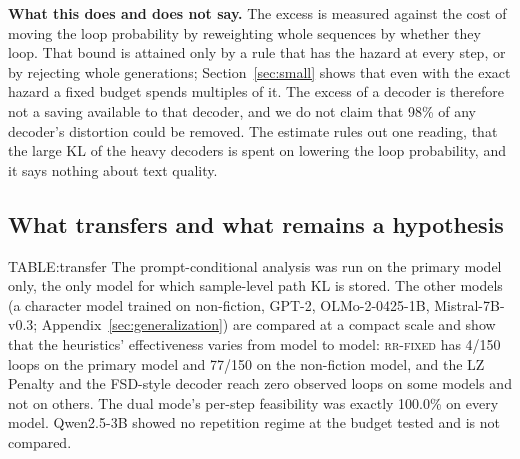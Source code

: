\textbf{What this does and does not say.} The excess is measured against the cost of moving the loop probability by reweighting whole sequences by whether they loop. That bound is attained only by a rule that has the hazard at every step, or by rejecting whole generations; Section~\ref{sec:small} shows that even with the exact hazard a fixed budget spends multiples of it. The excess of a decoder is therefore not a saving available to that decoder, and we do not claim that 98\% of any decoder's distortion could be removed. The estimate rules out one reading, that the large KL of the heavy decoders is spent on lowering the loop probability, and it says nothing about text quality.

\subsection{What transfers and what remains a hypothesis}\label{ssec:transfer}
{{TABLE:transfer}}
The prompt-conditional analysis was run on the primary model only, the only model for which sample-level path KL is stored. The other models (a character model trained on non-fiction, GPT-2, OLMo-2-0425-1B, Mistral-7B-v0.3; Appendix~\ref{sec:generalization}) are compared at a compact scale and show that the heuristics' effectiveness varies from model to model: \textsc{rr-fixed} has 4/150 loops on the primary model and 77/150 on the non-fiction model, and the LZ Penalty and the FSD-style decoder reach zero observed loops on some models and not on others. The dual mode's per-step feasibility was exactly 100.0\% on every model. Qwen2.5-3B showed no repetition regime at the budget tested and is not compared.

